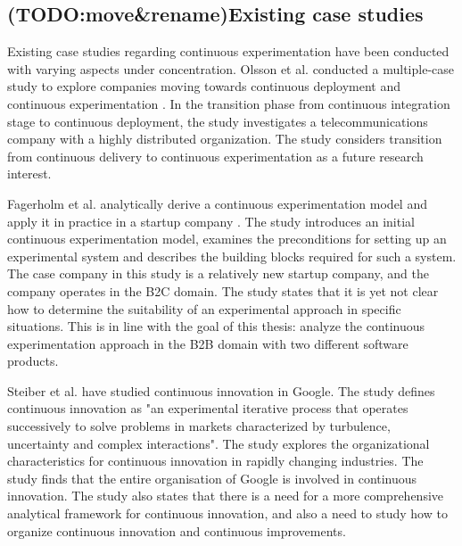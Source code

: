 \documentclass[english]{tktltiki2}
\theoremstyle{definition}
\theoremstyle{remark}
\begin{document}

\subsection{(TODO:move\&rename)Existing case studies}


Existing case studies regarding continuous experimentation have been conducted with varying aspects under concentration. Olsson et al. conducted a multiple-case study to explore companies moving towards continuous deployment and continuous experimentation \cite{olsson2012climbing}. In the transition phase from continuous integration stage to continuous deployment, the study investigates a telecommunications company with a highly distributed organization. The study considers transition from continuous delivery to continuous experimentation as a future research interest. 

Fagerholm et al. analytically derive a continuous experimentation model and apply it in practice in a startup company \cite{fagerholm2014building}. The study introduces an initial continuous experimentation model, examines the preconditions for setting up an experimental system and describes the building blocks required for such a system. The case company in this study is a relatively new startup company, and the company operates in the B2C domain. The study states that it is yet not clear how to determine the suitability of an experimental approach in specific situations. This is in line with the goal of this thesis: analyze the continuous experimentation approach in the B2B domain with two different software products.

Steiber et al. \cite{steiber2013corporate} have studied continuous innovation in Google. The study defines continuous innovation as "an experimental iterative process that operates successively to solve problems in markets characterized by turbulence, uncertainty and complex interactions". The study explores the organizational characteristics for continuous innovation in rapidly changing industries. The study finds that the entire organisation of Google is involved in continuous innovation. The study also states that there is a need for a more comprehensive analytical framework for continuous innovation, and also a need to study how to organize continuous innovation and continuous improvements.   
\end{document}

